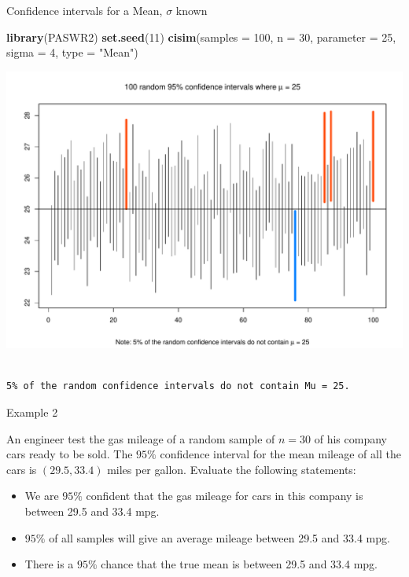 \documentclass[
  ignorenonframetext,
]{beamer}
\newenvironment{Shaded}{\begin{snugshade}}{\end{snugshade}}
\newcommand{\AttributeTok}[1]{\textcolor[rgb]{0.13,0.29,0.53}{#1}}
\newcommand{\DecValTok}[1]{\textcolor[rgb]{0.00,0.00,0.81}{#1}}
\newcommand{\FunctionTok}[1]{\textcolor[rgb]{0.13,0.29,0.53}{\textbf{#1}}}
\newcommand{\NormalTok}[1]{#1}
\newcommand{\StringTok}[1]{\textcolor[rgb]{0.31,0.60,0.02}{#1}}
\begin{document}
\begin{frame}[fragile]{Confidence intervals for a Mean, \(\sigma\)
known}
\protect\hypertarget{confidence-intervals-for-a-mean-sigma-known-7}{}
\normalsize

\begin{Shaded}
\begin{Highlighting}[]
\FunctionTok{library}\NormalTok{(PASWR2)}
\FunctionTok{set.seed}\NormalTok{(}\DecValTok{11}\NormalTok{)}
\FunctionTok{cisim}\NormalTok{(}\AttributeTok{samples =} \DecValTok{100}\NormalTok{, }\AttributeTok{n =} \DecValTok{30}\NormalTok{, }\AttributeTok{parameter =} \DecValTok{25}\NormalTok{, }\AttributeTok{sigma =} \DecValTok{4}\NormalTok{, }
      \AttributeTok{type =} \StringTok{"Mean"}\NormalTok{)}
\end{Highlighting}
\end{Shaded}

\begin{center}\includegraphics[width=0.6\linewidth,height=0.4\textheight]{Week10_Lect_files/figure-beamer/unnamed-chunk-51-1} \end{center}

\begin{verbatim}

5% of the random confidence intervals do not contain Mu = 25.
\end{verbatim}

\normalsize
\end{frame}

\begin{frame}{Example 2}
\protect\hypertarget{example-2}{}
\begin{tcolorbox}
An engineer test the gas mileage of a random sample of $n=30$ of his company cars ready to be sold. The $95\%$ confidence interval for the mean mileage of all the cars is $(29.5, 33.4)$ miles per gallon. Evaluate the following statements:
\begin{itemize}
\item We are $95\%$ confident that the gas mileage for cars in this company is between 29.5 and 33.4 mpg.

\item $95\%$ of all samples will give an average mileage between 29.5 and 33.4 mpg.

\item There is a $95\%$ chance that the true mean is between 29.5 and 33.4 mpg.
\end{itemize}
\end{tcolorbox}
\end{frame}
\end{document}

